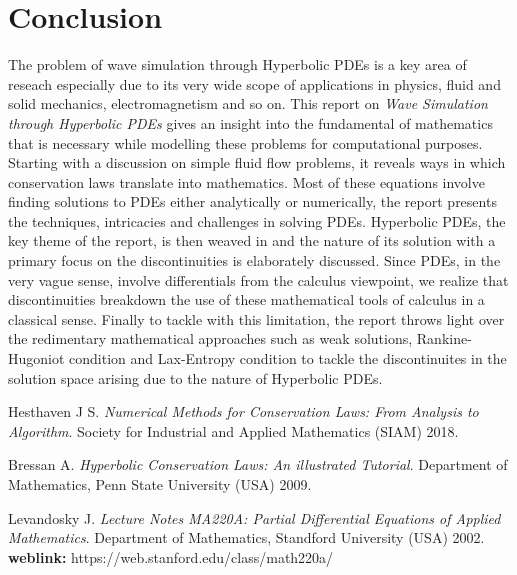 \documentclass[11pt, a4paper]{report}
\begin{document}
\chapter*{Conclusion}
The problem of wave simulation through Hyperbolic PDEs is a key area of reseach especially due to its very wide
scope of applications in physics, fluid and solid mechanics, electromagnetism and so on. This report on \emph{Wave 
Simulation through Hyperbolic PDEs} gives an insight into the fundamental of mathematics that is necessary while 
modelling these problems for computational purposes. Starting with a discussion on simple fluid flow problems, it
reveals ways in which conservation laws translate into mathematics. Most of these equations involve finding solutions 
to PDEs either analytically or numerically, the report presents the techniques, intricacies and challenges in solving
PDEs. Hyperbolic PDEs, the key theme of the report, is then weaved in and the nature of its solution with a primary 
focus on the discontinuities is elaborately discussed. Since PDEs, in the very vague sense, involve differentials 
from the calculus viewpoint, we realize that discontinuities breakdown the use of these mathematical tools of 
calculus in a classical sense. Finally to tackle with this limitation, the report throws light over the redimentary 
mathematical approaches such as weak solutions, Rankine-Hugoniot condition and Lax-Entropy condition to tackle the
discontinuites in the solution space arising due to the nature of Hyperbolic PDEs. 



\newpage
\begin{thebibliography}{3}
Hesthaven J S. \textit{Numerical Methods for Conservation Laws: From Analysis to Algorithm}. Society for Industrial and Applied Mathematics (SIAM) 2018.
    
Bressan A. \textit{Hyperbolic Conservation Laws: An illustrated Tutorial}. Department of Mathematics, Penn State University (USA) 2009.

Levandosky J. \textit{Lecture Notes MA220A: Partial Differential Equations of Applied Mathematics}. Department of Mathematics, Standford University (USA) 2002.\\
{\bfseries weblink:} https://web.stanford.edu/class/math220a/  
\end{thebibliography}
\end{document}
